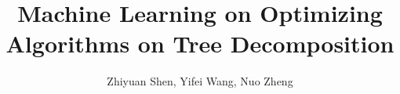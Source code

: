 \documentclass[10pt,journal,compsoc]{IEEEtran} %
\begin{document}
\title{Machine Learning on Optimizing Algorithms on Tree Decomposition}

\author{Zhiyuan Shen,
Yifei Wang,
Nuo Zheng
}


\IEEEtitleabstractindextext{%
\begin{abstract}

\end{abstract}

}

\maketitle










\end{document}

